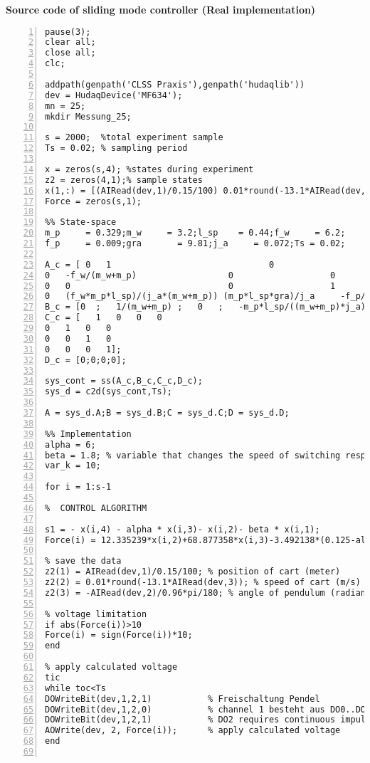 \normalsize\bf{Source code of sliding mode controller (Real implementation)}
\label{smcReal}
\vspace{1cm}
\begin{lstlisting}[numbers=left,basicstyle=\scriptsize,caption={Source code of sliding mode controller (Real implementation).},captionpos=b]	
pause(3);
clear all;
close all;
clc;

addpath(genpath('CLSS Praxis'),genpath('hudaqlib'))
dev = HudaqDevice('MF634');
mn = 25;
mkdir Messung_25;

s = 2000;  %total experiment sample
Ts = 0.02; % sampling period

x = zeros(s,4); %states during experiment
z2 = zeros(4,1);% sample states
x(1,:) = [(AIRead(dev,1)/0.15/100) 0.01*round(-13.1*AIRead(dev,3)) (-AIRead(dev,2)/0.96*pi/180) 0]; % inital values
Force = zeros(s,1); 

%% State-space
m_p     = 0.329;m_w     = 3.2;l_sp    = 0.44;f_w     = 6.2; 
f_p     = 0.009;gra       = 9.81;j_a     = 0.072;Ts = 0.02; 

A_c = [ 0   1                               0                   0
0   -f_w/(m_w+m_p)                  0                   0
0   0                               0                   1
0   (f_w*m_p*l_sp)/(j_a*(m_w+m_p)) (m_p*l_sp*gra)/j_a     -f_p/j_a];   
B_c = [0  ;   1/(m_w+m_p) ;   0   ;   -m_p*l_sp/((m_w+m_p)*j_a)];
C_c = [   1   0   0   0
0   1   0   0
0   0   1   0
0   0   0   1];
D_c = [0;0;0;0];

sys_cont = ss(A_c,B_c,C_c,D_c);
sys_d = c2d(sys_cont,Ts);

A = sys_d.A;B = sys_d.B;C = sys_d.C;D = sys_d.D;

%% Implementation
alpha = 6;  
beta = 1.8; % variable that changes the speed of switching resp the duty cycle
var_k = 10;

for i = 1:s-1

%  CONTROL ALGORITHM

s1 = - x(i,4) - alpha * x(i,3)- x(i,2)- beta * x(i,1); 
Force(i) = 12.335239*x(i,2)+68.877358*x(i,3)-3.492138*(0.125-alpha)*x(i,4)-3.492138*(1.7568-beta)*x(i,2)-(var_k * sign(s1));

% save the data
z2(1) = AIRead(dev,1)/0.15/100; % position of cart (meter)
z2(2) = 0.01*round(-13.1*AIRead(dev,3)); % speed of cart (m/s)
z2(3) = -AIRead(dev,2)/0.96*pi/180; % angle of pendulum (radian)

% voltage limitation
if abs(Force(i))>10
Force(i) = sign(Force(i))*10; 
end

% apply calculated voltage    
tic
while toc<Ts
DOWriteBit(dev,1,2,1)           % Freischaltung Pendel
DOWriteBit(dev,1,2,0)           % channel 1 besteht aus DO0..DO7
DOWriteBit(dev,1,2,1)           % DO2 requires continuous impuls
AOWrite(dev, 2, Force(i));      % apply calculated voltage
end


\end{lstlisting}
